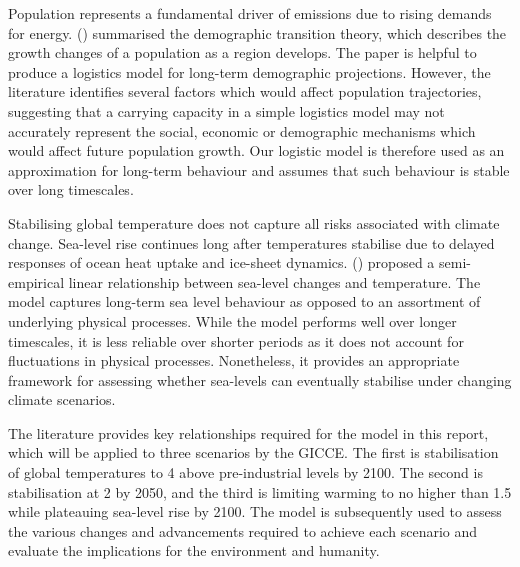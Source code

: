 \documentclass[12pt]{article}
\renewcommand{\textcite}[1]{\citeauthor{#1} (\citeyear{#1})}
\begin{document}
Population represents a fundamental driver of emissions due to rising demands for energy.
\textcite{lee_2003}\supercite{lee_2003} summarised the demographic transition theory,
which describes the growth changes of a population as a region develops.
The paper is helpful to produce a logistics model for long-term demographic projections.
However, the literature identifies several factors which would affect population trajectories,
suggesting that a carrying capacity in a simple logistics model may not accurately represent
the social, economic or demographic mechanisms which would affect future population growth.
Our logistic model is therefore used as an approximation for long-term behaviour and assumes
that such behaviour is stable over long timescales.

Stabilising global temperature does not capture all risks associated with climate change.
Sea-level rise continues long after temperatures stabilise due to delayed responses of ocean heat uptake and ice-sheet dynamics.
\textcite{rahmstorf_2007}\supercite{rahmstorf_2007} proposed a semi-empirical linear relationship between sea-level changes and temperature.
The model captures long-term sea level behaviour as opposed to an assortment of underlying physical processes.
While the model performs well over longer timescales,
it is less reliable over shorter periods as it does not account for fluctuations in physical processes.
Nonetheless, it provides an appropriate framework for assessing whether sea-levels can eventually stabilise
under changing climate scenarios.

The literature provides key relationships required for the model in this report,
which will be applied to three scenarios by the GICCE.
The first is stabilisation of global temperatures to 4 above pre-industrial levels by 2100.
The second is stabilisation at 2 by 2050,
and the third is limiting warming to no higher than 1.5 while plateauing sea-level rise by 2100.
The model is subsequently used to assess the various changes and advancements required to achieve each scenario
and evaluate the implications for the environment and humanity.
\end{document}
